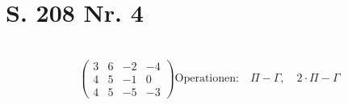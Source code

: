 \documentclass[12pt,a4paper]{report}
\begin{document}
	\section{S. 208 Nr. 4} \\
	\begin{equation}
		\left(
\begin{array}{ccc|c}
  3 & 6 & -2 & -4 \\
  4 & 5 & -1 & 0 \\
  4 & 5 & -5 & -3
\end{array}
\right)

\text{Operationen:} \quad \Pi - \Gamma, \quad 2 \cdot \Pi - \Gamma
	\end{equation}
\end{document}
